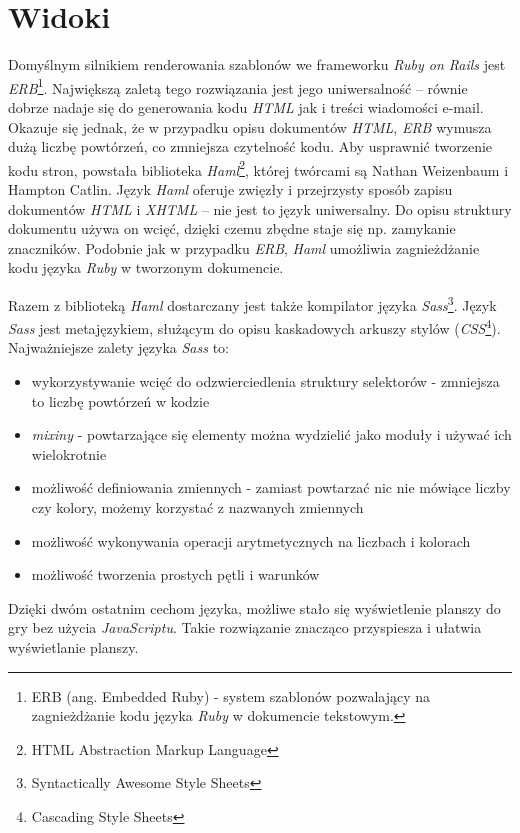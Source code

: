 \documentclass[11pt,twoside]{report}
\begin{document}
\section{Widoki}
Domyślnym silnikiem renderowania szablonów we frameworku \emph{Ruby on
  Rails} jest \emph{ERB}\footnote{ERB (ang. Embedded Ruby) - system
  szablonów pozwalający na zagnieżdżanie kodu języka \emph{Ruby} w
  dokumencie tekstowym.}. Największą zaletą tego rozwiązania jest jego
uniwersalność -- równie dobrze nadaje się do generowania kodu
\emph{HTML} jak i treści wiadomości e-mail. Okazuje się jednak, że w
przypadku opisu dokumentów \emph{HTML}, \emph{ERB} wymusza dużą liczbę
powtórzeń, co zmniejsza czytelność kodu. Aby usprawnić tworzenie kodu
stron, powstała biblioteka \emph{Haml}\footnote{HTML Abstraction
  Markup Language}, której twórcami są Nathan Weizenbaum i Hampton
Catlin. Język \emph{Haml} oferuje zwięzły i przejrzysty sposób zapisu
dokumentów \emph{HTML} i \emph{XHTML} -- nie jest to język
uniwersalny. Do opisu struktury dokumentu używa on wcięć, dzięki czemu
zbędne staje się np. zamykanie znaczników. Podobnie jak w przypadku
\emph{ERB}, \emph{Haml} umożliwia zagnieżdżanie kodu języka
\emph{Ruby} w tworzonym dokumencie.

Razem z biblioteką \emph{Haml} dostarczany jest także kompilator
języka \emph{Sass}\footnote{Syntactically Awesome Style Sheets}. Język
\emph{Sass} jest metajęzykiem, służącym do opisu kaskadowych arkuszy
stylów (\emph{CSS}\footnote{Cascading Style Sheets}). Najważniejsze
zalety języka \emph{Sass} to:

\begin{itemize}
\item wykorzystywanie wcięć do odzwierciedlenia struktury selektorów -
  zmniejsza to liczbę powtórzeń w kodzie
\item \emph{mixiny} - powtarzające się elementy można
  wydzielić jako moduły i używać ich wielokrotnie
\item możliwość definiowania zmiennych - zamiast powtarzać nic nie
  mówiące liczby czy kolory, możemy korzystać z nazwanych
  zmiennych
\item możliwość wykonywania operacji arytmetycznych na liczbach i
  kolorach
\item możliwość tworzenia prostych pętli i warunków
\end{itemize}

Dzięki dwóm ostatnim cechom języka, możliwe stało się wyświetlenie
planszy do gry bez użycia \emph{JavaScriptu}. Takie rozwiązanie
znacząco przyspiesza i ułatwia wyświetlanie planszy.
\end{document}
